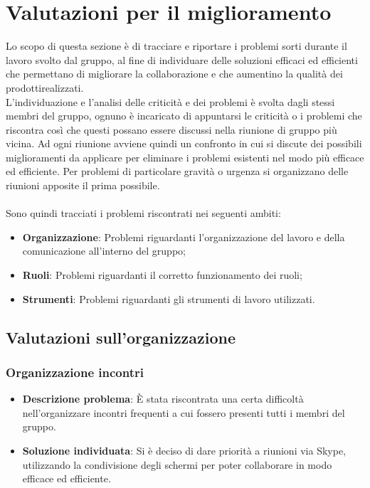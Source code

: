 \section{Valutazioni per il miglioramento} 
Lo scopo di questa sezione è di tracciare e riportare i problemi sorti durante il lavoro svolto dal gruppo, al fine di individuare delle soluzioni efficaci ed efficienti che permettano di migliorare la collaborazione e che aumentino la qualità dei prodotti\glosp realizzati.
\\L'individuazione e l'analisi delle criticità e dei problemi è svolta dagli stessi membri del gruppo, ognuno è incaricato di appuntarsi le criticità o i problemi che riscontra così che questi possano essere discussi nella riunione di gruppo più vicina. Ad ogni riunione avviene quindi un confronto in cui si discute dei possibili miglioramenti da applicare per eliminare i problemi esistenti nel modo più efficace ed efficiente. Per problemi di particolare gravità o urgenza si organizzano delle riunioni apposite il prima possibile.
\\ \\Sono quindi tracciati i problemi riscontrati nei seguenti ambiti:

\begin{itemize}
	\item \textbf{Organizzazione}: Problemi riguardanti l'organizzazione del lavoro e della comunicazione all'interno del gruppo;
	\item \textbf{Ruoli}: Problemi riguardanti il corretto funzionamento dei ruoli;
	\item \textbf{Strumenti}: Problemi riguardanti gli strumenti di lavoro utilizzati.
\end{itemize}

\subsection{Valutazioni sull'organizzazione}
	\subsubsection{Organizzazione incontri}
		\begin{itemize}
			\item \textbf{Descrizione problema}: È stata riscontrata una certa difficoltà nell'organizzare incontri frequenti a cui fossero presenti tutti i membri del gruppo.
			\item \textbf{Soluzione individuata}: Si è deciso di dare priorità a riunioni via Skype, utilizzando la condivisione degli schermi per poter collaborare in modo efficace ed efficiente.
		\end{itemize}
